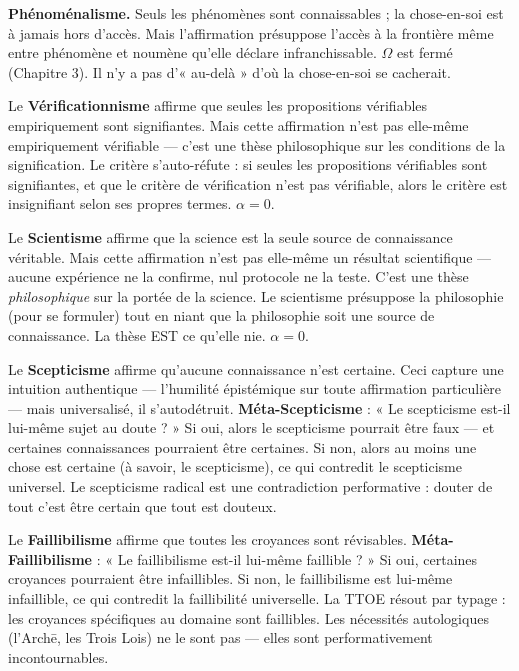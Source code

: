 \documentclass[10pt, openany, oneside]{book}
\begin{document}
\textbf{Phénoménalisme.} Seuls les phénomènes sont connaissables ; la chose-en-soi est à jamais hors d'accès. Mais l'affirmation présuppose l'accès à la frontière même entre phénomène et noumène qu'elle déclare infranchissable. $\Omega$ est fermé (Chapitre 3). Il n'y a pas d'« au-delà » d'où la chose-en-soi se cacherait.

Le \textbf{Vérificationnisme} affirme que seules les propositions vérifiables empiriquement sont signifiantes. Mais cette affirmation n'est pas elle-même empiriquement vérifiable --- c'est une thèse philosophique sur les conditions de la signification. Le critère s'auto-réfute : si seules les propositions vérifiables sont signifiantes, et que le critère de vérification n'est pas vérifiable, alors le critère est insignifiant selon ses propres termes. $\alpha = 0$.

Le \textbf{Scientisme} affirme que la science est la seule source de connaissance véritable. Mais cette affirmation n'est pas elle-même un résultat scientifique --- aucune expérience ne la confirme, nul protocole ne la teste. C'est une thèse \textit{philosophique} sur la portée de la science. Le scientisme présuppose la philosophie (pour se formuler) tout en niant que la philosophie soit une source de connaissance. La thèse EST ce qu'elle nie. $\alpha = 0$.

Le \textbf{Scepticisme} affirme qu'aucune connaissance n'est certaine. Ceci capture une intuition authentique --- l'humilité épistémique sur toute affirmation particulière --- mais universalisé, il s'autodétruit. \textbf{Méta-Scepticisme} : « Le scepticisme est-il lui-même sujet au doute ? » Si oui, alors le scepticisme pourrait être faux --- et certaines connaissances pourraient être certaines. Si non, alors au moins une chose est certaine (à savoir, le scepticisme), ce qui contredit le scepticisme universel. Le scepticisme radical est une contradiction performative : douter de tout c'est être certain que tout est douteux.

Le \textbf{Faillibilisme} affirme que toutes les croyances sont révisables. \textbf{Méta-Faillibilisme} : « Le faillibilisme est-il lui-même faillible ? » Si oui, certaines croyances pourraient être infaillibles. Si non, le faillibilisme est lui-même infaillible, ce qui contredit la faillibilité universelle. La TTOE résout par typage : les croyances spécifiques au domaine sont faillibles. Les nécessités autologiques (l'Arch\={e}, les Trois Lois) ne le sont pas --- elles sont performativement incontournables.
\end{document}
